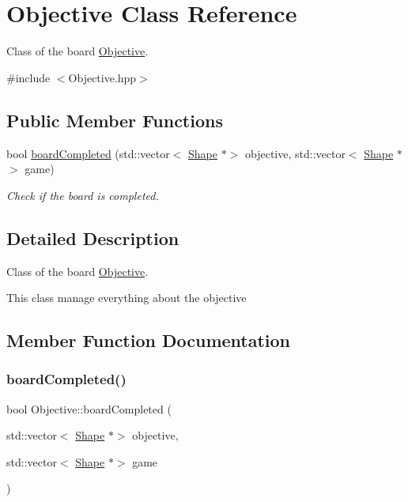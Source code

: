 \hypertarget{classObjective}{}\section{Objective Class Reference}
\label{classObjective}


Class of the board \hyperlink{classObjective}{Objective}.  




{\ttfamily \#include $<$Objective.\+hpp$>$}

\subsection*{Public Member Functions}
\begin{DoxyCompactItemize}
\item 
bool \hyperlink{classObjective_a91feb56425727473a806419a45d600d6}{board\+Completed} (std\+::vector$<$ \hyperlink{classShape}{Shape} $\ast$$>$ objective, std\+::vector$<$ \hyperlink{classShape}{Shape} $\ast$$>$ game)
\begin{DoxyCompactList}\small\item\em Check if the board is completed. \end{DoxyCompactList}\end{DoxyCompactItemize}


\subsection{Detailed Description}
Class of the board \hyperlink{classObjective}{Objective}. 

This class manage everything about the objective 

\subsection{Member Function Documentation}
\mbox{\label{classObjective_a91feb56425727473a806419a45d600d6}} 
\subsubsection{\texorpdfstring{board\+Completed()}{boardCompleted()}}
{\footnotesize\ttfamily bool Objective\+::board\+Completed (\begin{DoxyParamCaption}\item[{std\+::vector$<$ \hyperlink{classShape}{Shape} $\ast$$>$}]{objective,  }\item[{std\+::vector$<$ \hyperlink{classShape}{Shape} $\ast$$>$}]{game }\end{DoxyParamCaption})}




